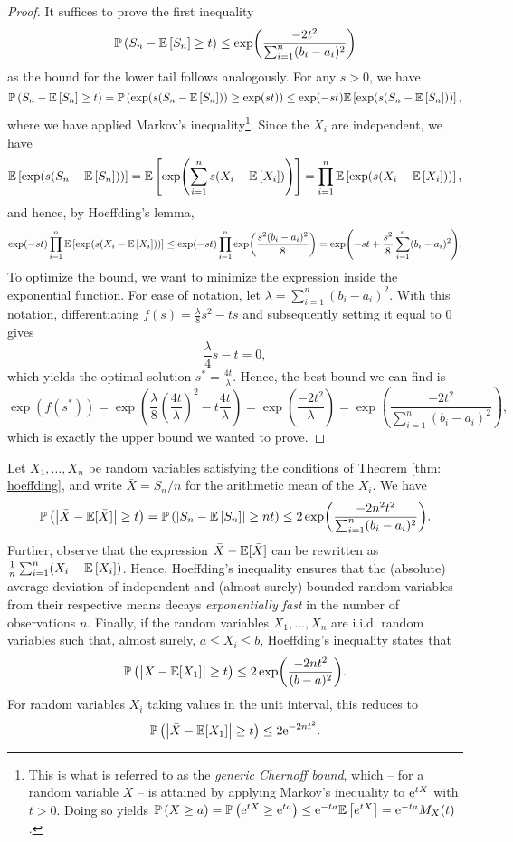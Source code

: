 \begin{proof}
It suffices to prove the first inequality
\[
    \mathbb{P}\left(S_n - \mathbb{E}\left[S_n\right] \geq t\right) \leq \exp(\frac{-2t^2}{\sum_{i=1}^n (b_i - a_i)^2})
\]
as the bound for the lower tail follows analogously. For any $s>0$, we have
\[
    \mathbb{P}\left(S_n - \mathbb{E}\left[S_n\right] \geq t\right) = \mathbb{P}\left(\exp(s(S_n - \mathbb{E}\left[S_n\right])) \geq \exp(st)\right) \leq \exp(-st) \mathbb{E}\left[\exp(s(S_n - \mathbb{E}\left[S_n\right]))\right],
\]
where we have applied Markov's inequality\footnote{This is what is referred to as the \emph{generic Chernoff bound}, which -- for a random variable $X$ -- is attained by applying Markov's inequality to $\mathrm{e}^{tX}$ with $t > 0$. Doing so yields $\mathbb{P}\left(X \geq a\right) = \mathbb{P}\left(\mathrm{e}^{tX} \geq \mathrm{e}^{ta}\right) \leq \mathrm{e}^{-ta} \mathbb{E}\left[e^{tX}\right] = \mathrm{e}^{-ta} M_X(t)$.}. Since the $X_i$ are independent, we have
\[
    \mathbb{E}\left[\exp(s(S_n - \mathbb{E}\left[S_n\right]))\right] = \mathbb{E}\left[\exp(\sum_{i=1}^n s(X_i - \mathbb{E}\left[X_i\right]))\right] = \prod_{i=1}^n \mathbb{E}\left[\exp(s(X_i - \mathbb{E}\left[X_i\right]))\right],
\]
and hence, by Hoeffding's lemma,
\[
    \exp(-st) \prod_{i=1}^n \mathbb{E}\left[\exp(s(X_i - \mathbb{E}\left[X_i\right]))\right] \leq \exp(-st) \prod_{i=1}^n \exp(\frac{s^2 (b_i-a_i)^2}{8}) = \exp(-st + \frac{s^2}{8} \sum_{i=1}^n (b_i-a_i)^2).
\]
To optimize the bound, we want to minimize the expression inside the exponential function. For ease of notation, let $\lambda = \sum_{i=1}^n (b_i-a_i)^2$. With this notation, differentiating $f(s) = \frac{\lambda}{8} s^2 -ts$ and subsequently setting it equal to $0$ gives
\[
    \frac{\lambda}{4} s - t = 0,
\]
which yields the optimal solution $s^* = \frac{4t}{\lambda}$. Hence, the best bound we can find is
\[
    \exp(f(s^*)) = \exp(\frac{\lambda}{8} \left(\frac{4t}{\lambda}\right)^2 - t \frac{4t}{\lambda}) = \exp(\frac{-2t^2}{\lambda}) = \exp(\frac{-2t^2}{\sum_{i=1}^n (b_i - a_i)^2}),
\]
which is exactly the upper bound we wanted to prove.
\end{proof}

\begin{remark}
Let $X_1, \dots, X_n$ be random variables satisfying the conditions of Theorem \ref{thm: hoeffding}, and write $\bar X = S_n/n$ for the arithmetic mean of the $X_i$. We have
\[
    \mathbb{P}\left(\abs{\bar X - \mathbb{E}[\bar X]} \geq t\right) = \mathbb{P}\left(\abs{S_n - \mathbb{E}\left[S_n\right]} \geq nt\right) \leq 2 \exp(\frac{-2n^2t^2}{\sum_{i=1}^n (b_i - a_i)^2}).
\]
Further, observe that the expression $\bar X - \mathbb{E}[\bar X]$ can be rewritten as $\frac{1}{n} \sum_{i=1}^n (X_i - \mathbb{E}\left[X_i\right])$. Hence, Hoeffding's inequality ensures that the (absolute) average deviation of independent and (almost surely) bounded random variables from their respective means decays \emph{exponentially fast} in the number of observations $n$. Finally, if the random variables $X_1, \dots, X_n$ are i.i.d. random variables such that, almost surely, $a \leq X_i \leq b$, Hoeffding's inequality states that
\[
    \mathbb{P}\left(\abs{\bar X - \mathbb{E}[X_1]} \geq t\right) \leq 2 \exp(\frac{-2nt^2}{(b - a)^2}).
\]
For random variables $X_i$ taking values in the unit interval, this reduces to
\[
    \mathbb{P}\left(\abs{\bar X - \mathbb{E}[X_1]} \geq t\right) \leq 2 \mathrm{e}^{-2nt^2}.
\]
\end{remark}
